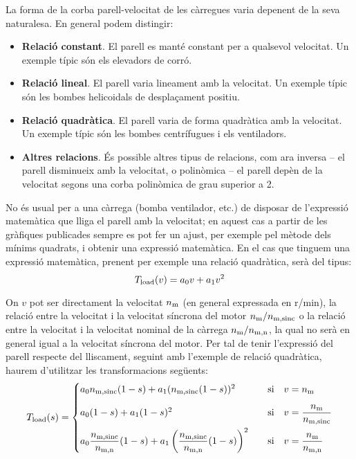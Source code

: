 La forma de la corba parell-velocitat de les càrregues varia depenent de la seva naturalesa. En general podem distingir:
\begin{itemize}
	\item  \textbf{Relació constant}. El parell es manté constant per a qualsevol velocitat. Un exemple típic són els elevadors de corró.
	
	\item  \textbf{Relació lineal}. El parell varia lineament amb la velocitat. Un exemple típic són les bombes helicoidals de desplaçament positiu.
	
	\item  \textbf{Relació quadràtica}. El parell varia de forma  quadràtica  amb la velocitat. Un exemple típic són les bombes centrífugues i els ventiladors.
	
	\item  \textbf{Altres relacions}. És possible altres tipus de relacions, com ara inversa -- el parell disminueix amb la velocitat, o polinòmica -- el parell depèn de la velocitat segons una corba polinòmica de grau superior a 2.
\end{itemize}

No és  usual per a una càrrega (bomba ventilador, etc.) de disposar de l'expressió matemàtica que lliga el parell amb la velocitat; en aquest cas a partir de les gràfiques publicades sempre es pot fer un ajust, per exemple pel mètode dels mínims quadrats, i obtenir una expressió matemàtica. En el cas que tinguem una expressió matemàtica, prenent per exemple una relació quadràtica, serà del tipus:
\begin{equation}
	T_\mathrm{load}(v) = a_0 v + a_1 v^2
\end{equation}

On $v$ pot ser directament la velocitat $n_\mathrm{m}$ (en general expressada en r/min),  la relació entre la velocitat i la velocitat síncrona del motor $n_\mathrm{m}/n_\mathrm{m,sinc}$ o la relació entre la velocitat i la velocitat nominal de la càrrega $n_\mathrm{m}/n_\mathrm{m,n}$, la qual no serà en general igual a la velocitat síncrona del motor. Per tal de tenir l'expressió del parell respecte del lliscament,  seguint amb l'exemple de relació quadràtica, haurem d'utilitzar les transformacions següents:
\begin{equation}\label{eq:Tload-v-s}
	T_\mathrm{load}(s) = \begin{cases}
		 a_0 n_\mathrm{m,sinc}(1-s) + a_1 (n_\mathrm{m,sinc}(1-s))^2  & \quad\text{si}\quad v=n_\mathrm{m}  \\[2ex]
		a_0 (1-s) + a_1 (1-s)^2 & \quad\text{si}\quad  v =\dfrac{n_\mathrm{m}}{n_\mathrm{m,sinc}} \\[2ex]
		 a_0 \dfrac{n_\mathrm{m,sinc}}{n_\mathrm{m,n}}(1-s) + a_1 \left(\dfrac{n_\mathrm{m,sinc}}{n_\mathrm{m,n}}(1-s)\right)^2 &   \quad\text{si}\quad v = \dfrac{n_\mathrm{m}}{n_\mathrm{m,n}}
	\end{cases}
\end{equation}


